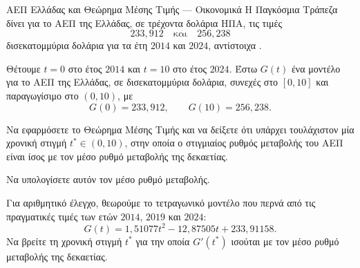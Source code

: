 \begin{problhma}{ΑΕΠ Ελλάδας και Θεώρημα Μέσης Τιμής --- Οικονομικά}
Η Παγκόσμια Τράπεζα δίνει για το ΑΕΠ της Ελλάδας, σε τρέχοντα
δολάρια ΗΠΑ, τις τιμές
\[
  233{,}912
  \quad\text{και}\quad
  256{,}238
\]
δισεκατομμύρια δολάρια για τα έτη \(2014\) και \(2024\), αντίστοιχα
\cite{worldBankGreeceGDPCurrentUS}.

Θέτουμε \(t=0\) στο έτος \(2014\) και \(t=10\) στο έτος \(2024\).
Έστω \(G(t)\) ένα μοντέλο για το ΑΕΠ της Ελλάδας, σε δισεκατομμύρια
δολάρια, συνεχές στο \([0,10]\) και παραγωγίσιμο στο \((0,10)\), με
\[
  G(0)=233{,}912,
  \qquad
  G(10)=256{,}238.
\]
\begin{alist}
  \item Να εφαρμόσετε το Θεώρημα Μέσης Τιμής και να δείξετε ότι υπάρχει
        τουλάχιστον μία χρονική στιγμή \(t^*\in(0,10)\), στην οποία ο
        στιγμιαίος ρυθμός μεταβολής του ΑΕΠ είναι ίσος με τον μέσο
        ρυθμό μεταβολής της δεκαετίας.
  \item Να υπολογίσετε αυτόν τον μέσο ρυθμό μεταβολής.
  \item Για αριθμητικό έλεγχο, θεωρούμε το τετραγωνικό μοντέλο που
        περνά από τις πραγματικές τιμές των ετών \(2014\), \(2019\) και
        \(2024\):
        \[
          G(t)=1{,}51077t^2-12{,}87505t+233{,}91158.
        \]
        Να βρείτε τη χρονική στιγμή \(t^*\) για την οποία
        \(G'(t^*)\) ισούται με τον μέσο ρυθμό μεταβολής της δεκαετίας.
\end{alist}

\begin{center}
\end{center}
\end{problhma}
